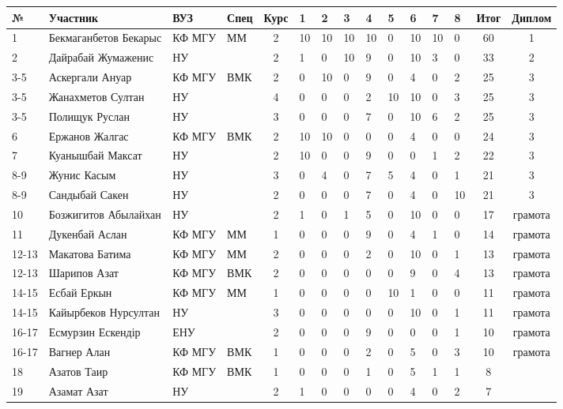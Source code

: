 \begin{tabular}{|l|l|l|l|c|*{8}{p{0.3cm}|}c|c|}
\hline
№ & Участник & ВУЗ & Спец & Курс & 1 & 2 & 3 & 4 & 5 & 6 & 7 & 8 & Итог & Диплом\\
\hline
1 & Бекмаганбетов Бекарыс & КФ МГУ & ММ &2 & 10 & 10 & 10 & 10 & 0 & 10 & 10 & 0 & 60 & 1\\
\hline
2 & Дайрабай Жумаженис & НУ & & 2 & 1 & 0 & 10 & 9 & 0 & 10 & 3 & 0 & 33 & 2\\
\hline
3-5 & Аскергали Ануар & КФ МГУ & ВМК & 2 & 0 & 10 & 0 & 9 & 0 & 4 & 0 & 2 & 25 & 3\\
\hline
3-5 & Жанахметов Султан & НУ & & 4 & 0 & 0 & 0 & 2 & 10 & 10 & 0 & 3 & 25 & 3\\
\hline
3-5 & Полищук Руслан & НУ & & 3 & 0 & 0 & 0 & 7 & 0 & 10 & 6 & 2 & 25 & 3\\
\hline
6 & Ержанов Жалгас & КФ МГУ & ВМК & 2 & 10 & 10 & 0 & 0 & 0 & 4 & 0 & 0 & 24 & 3\\
\hline
7 & Куанышбай Максат & НУ & & 2 & 10 & 0 & 0 & 9 & 0 & 0 & 1 & 2 & 22 & 3\\
\hline
8-9 & Жунис Касым & НУ & & 3 & 0 & 4 & 0 & 7 & 5 & 4 & 0 & 1 & 21 & 3\\
\hline
8-9 & Сандыбай Сакен & НУ & & 2 & 0 & 0 & 0 & 7 & 0 & 4 & 0 & 10 & 21 & 3\\
\hline
10 & Бозжигитов Абылайхан & НУ & & 2 & 1 & 0 & 1 & 5 & 0 & 10 & 0 & 0 & 17 & грамота\\
\hline
11 & Дукенбай Аслан & КФ МГУ & ММ & 1 & 0 & 0 & 0 & 9 & 0 & 4 & 1 & 0 & 14 & грамота\\
\hline
12-13 & Макатова Батима & КФ МГУ & ММ & 2 & 0 & 0 & 0 & 2 & 0 & 10 & 0 & 1 & 13 & грамота\\
\hline
12-13 & Шарипов Азат & КФ МГУ & ВМК & 2 & 0 & 0 & 0 & 0 & 0 & 9 & 0 & 4 & 13 & грамота\\
\hline
14-15 & Есбай Еркын & КФ МГУ & ММ & 1 & 0 & 0 & 0 & 0 & 10 & 1 & 0 & 0 & 11 & грамота\\
\hline
14-15 & Кайырбеков Нурсултан & НУ & & 3 & 0 & 0 & 0 & 0 & 0 & 10 & 0 & 1 & 11 & грамота\\
\hline
16-17 & Есмурзин Ескендір & ЕНУ & & 2 & 0 & 0 & 0 & 9 & 0 & 0 & 0 & 1 & 10 & грамота\\
\hline
16-17 & Вагнер Алан & КФ МГУ & ВМК & 1 & 0 & 0 & 0 & 2 & 0 & 5 & 0 & 3 & 10 & грамота\\
\hline
18 & Азатов Таир & КФ МГУ & ВМК & 1 & 0 & 0 & 0 & 1 & 0 & 5 & 1 & 1 & 8 & \\
\hline
19 & Азамат Азат & НУ & & 2 & 1 & 0 & 0 & 0 & 0 & 4 & 0 & 2 & 7 & \\

\end{tabular}
